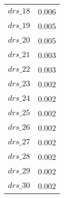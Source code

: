 \begin{center}
\begin{longtable}{cc}
$drs\_18$ 	 & 	 0.006 \\
$drs\_19$ 	 & 	 0.005 \\
$drs\_20$ 	 & 	 0.005 \\
$drs\_21$ 	 & 	 0.003 \\
$drs\_22$ 	 & 	 0.003 \\
$drs\_23$ 	 & 	 0.002 \\
$drs\_24$ 	 & 	 0.002 \\
$drs\_25$ 	 & 	 0.002 \\
$drs\_26$ 	 & 	 0.002 \\
$drs\_27$ 	 & 	 0.002 \\
$drs\_28$ 	 & 	 0.002 \\
$drs\_29$ 	 & 	 0.002 \\
$drs\_30$ 	 & 	 0.002 \\
\bottomrule%
\end{longtable}
\end{center}
